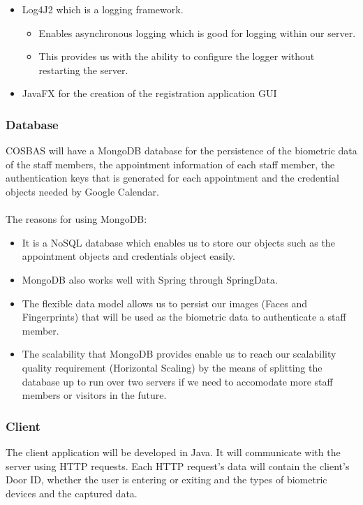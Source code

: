 \begin{itemize}
\begin{itemize}
		\end{itemize}
	\item Log4J2 which is a logging framework.
		\begin{itemize}
			\item Enables asynchronous logging which is good for logging within our server.
			\item This provides us with the ability to configure the logger without restarting the server.
		\end{itemize}
	\item JavaFX for the creation of the registration application GUI
\end{itemize}

\subsubsection{Database}
COSBAS will have a MongoDB database for the persistence of the biometric data of the staff members, the appointment information of each staff member, the authentication keys that is generated for each appointment and the credential objects needed by Google Calendar. \\
\\
The reasons for using MongoDB:
	\begin{itemize}
		\item It is a NoSQL database which enables us to store our objects such as the appointment objects and credentials object easily.
		\item MongoDB also works well with Spring through SpringData.
		\item The flexible data model allows us to persist our images (Faces and Fingerprints) that will be used as the biometric data to authenticate a staff member.
		\item The scalability that MongoDB provides enable us to reach our scalability quality requirement (Horizontal Scaling) by the means of splitting the database up to run over two servers if we need to accomodate more staff members or visitors in the future.
	\end{itemize}

\subsubsection{Client}
The client application will be developed in Java. It will communicate with the server using HTTP requests. Each HTTP request's data will contain the client's Door ID, whether the user is entering or exiting and the types of biometric devices and the captured data. 


